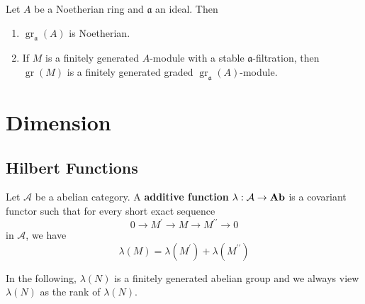 \begin{proposition}
    Let $A$ be a Noetherian ring and $\mathfrak{a}$ an ideal. Then
    \begin{enumerate}
        \item
              $\operatorname{gr}_{\mathfrak{a}}(A)$ is Noetherian.
        \item
              If $M$ is a finitely generated $A$-module with a stable $\mathfrak{a}$-filtration, then $\operatorname{gr}(M)$ is a finitely generated graded $\operatorname{gr}_{\mathfrak{a}}(A)$-module.
    \end{enumerate}
\end{proposition}



\chapter{Dimension}


\section{Hilbert Functions} %

\begin{definition}
    Let $\mathcal{A}$ be a abelian category. A \textbf{additive function} $\lambda: \mathcal{A} \rightarrow \mathbf{Ab}$ is a covariant functor such that for every short exact sequence
    \begin{equation*}
        0 \rightarrow M^\prime \rightarrow M \rightarrow M^{\prime\prime} \rightarrow 0
    \end{equation*}
    in $\mathcal{A}$, we have
    \begin{equation*}
        \lambda(M)=\lambda(M^\prime)+\lambda(M^{\prime\prime})
    \end{equation*}
\end{definition}

In the following, $\lambda(N)$ is a finitely generated abelian group and we always view $\lambda(N)$ as the rank of $\lambda(N)$.

